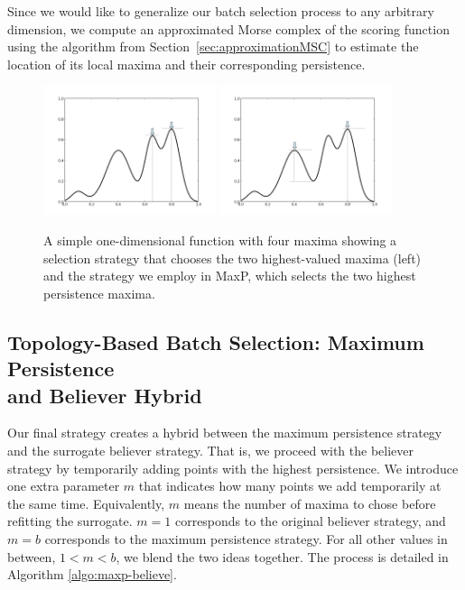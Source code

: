 Since we would like to generalize our batch selection process to any arbitrary dimension, we compute an approximated Morse complex of the scoring function using the algorithm from Section~\ref{sec:approximationMSC} to estimate the location of its local maxima and their corresponding persistence.

\begin{figure}[!ht]
\centering
\includegraphics[width=0.45\textwidth]{figs/chap5/persistence}
\includegraphics[width=0.45\textwidth]{figs/chap5/persistence2}
\caption{A simple one-dimensional function with four maxima showing a selection strategy that chooses the two highest-valued maxima (left) and the strategy we employ in MaxP, which selects the two highest persistence maxima.}
\label{fig:persistence}
\end{figure}

\subsection{Topology-Based Batch Selection: Maximum Persistence\\and Believer Hybrid}
Our final strategy creates a hybrid between the maximum persistence strategy and the surrogate believer strategy.
%
That is, we proceed with the believer strategy by temporarily adding points with the highest persistence.
%
We introduce one extra parameter $m$ that indicates how many points we add temporarily at the same time.
%
Equivalently, $m$ means the number of maxima to chose before refitting the surrogate.
%
$m=1$ corresponds to the original believer strategy, and $m = b$ corresponds to the maximum persistence strategy.
%
For all other values in between, $1 < m < b$, we blend the two ideas together.
%
The process is detailed in Algorithm \ref{algo:maxp-believe}.

